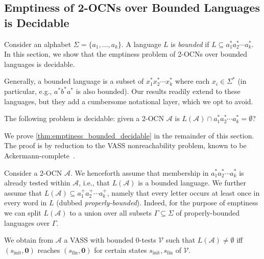 \documentclass[USenglish]{lipics-v2021}
\newcommand{\shtodo}[1]{\todo[color=cyan!25,size=\small]{SH: #1}}
\renewcommand{\vec}[1]{\boldsymbol{#1}}
\newcommand{\cA}{\mathcal{A}}
\newcommand{\cV}{\mathcal{V}}
\begin{document}
\subsection{Emptiness of 2-OCNs over Bounded Languages is Decidable}
\label{sec:bounded_languages}
\label{sec:2OCN_Bounded_to_VASS_intuitive} 
Consider an alphabet $\Sigma=\{a_1,\ldots,a_k\}$. A language $L$ is \emph{bounded} if $L\subseteq
a_1^*a_2^*\cdots a_k^*$. In this section, we show that the emptiness problem of
2-OCNs over bounded languages is decidable.
\begin{remark} %
	Generally, a bounded language is a subset of $x_1^*x_2^*\cdots x_k^*$ where each
	$x_i\in \Sigma^*$ (in particular, e.g., $a^*b^*a^*$ is also bounded). Our results
	readily extend to these languages, but they add a cumbersome notational
	layer, which we opt to avoid.
\end{remark}
\begin{theorem}
	\label{thm:emptiness_bounded_decidable} The following problem is decidable:
	given a 2-OCN $\cA$ is $L(\cA)\cap a_1^*a_2^*\cdots a_k^* = \emptyset$?
\end{theorem} 
We prove \cref{thm:emptiness_bounded_decidable} in the remainder of this section. The proof is by reduction to the VASS nonreachability problem, known to be
Ackermann-complete~\cite{czerwinski2022reachability}. 

Consider a 2-OCN $\cA$. We henceforth assume that membership in $a_1^*a_2^*\cdots a_k^*$ is already
tested within $\cA$, i.e., that $L(\cA)$ is a bounded language. We further assume
that $L(\cA)\subseteq a_1^+a_2^+\cdots a_k^+$, namely that every letter occurs at least once
in every word in $L$ (dubbed \emph{properly-bounded}). Indeed, for the purpose
of emptiness we can split $L(\cA)$ to a union over all subsets $\Gamma\subseteq \Sigma$ of
properly-bounded languages over $\Gamma$.

We obtain from $\cA$ a VASS with bounded 0-tests $\cV$ such that $L(\cA)\neq \emptyset$ iff
$(s_{\textrm{init}},\vec{0})$ reaches $(s_{\textrm{fin}},\vec{0})$ for certain
states $s_{\textrm{init}},s_{\textrm{fin}}$ of $\cV$.
\end{document}
